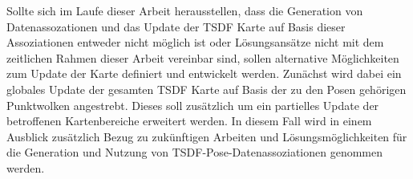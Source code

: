 Sollte sich im Laufe dieser Arbeit herausstellen, dass die Generation von Datenassozationen und das Update der TSDF Karte auf Basis dieser Assoziationen entweder nicht möglich ist oder Lösungsansätze nicht mit dem zeitlichen Rahmen dieser Arbeit vereinbar sind, sollen alternative Möglichkeiten zum Update der Karte definiert und entwickelt werden. Zunächst wird dabei ein globales Update der gesamten TSDF Karte auf Basis der zu den Posen gehörigen Punktwolken angestrebt. Dieses soll zusätzlich um ein partielles Update der betroffenen Kartenbereiche erweitert werden. In diesem Fall wird in einem Ausblick zusätzlich Bezug zu zukünftigen Arbeiten und Lösungsmöglichkeiten für die Generation und Nutzung von TSDF-Pose-Datenassoziationen genommen werden.


